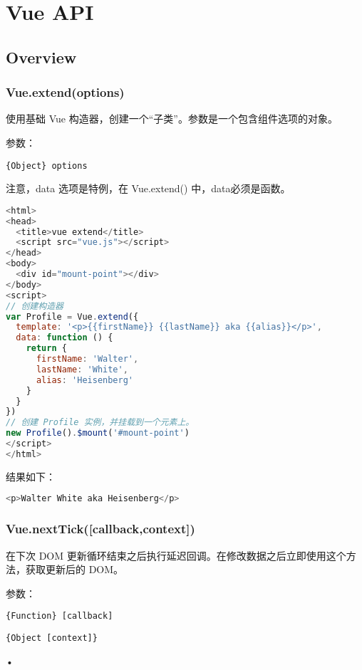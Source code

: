 \part{Vue API}


\chapter{Overview}


\section{Vue.extend(options)}

使用基础 Vue 构造器，创建一个“子类”。参数是一个包含组件选项的对象。

参数：


\begin{compactitem}
\item \texttt{\{Object\} options}
\end{compactitem}


注意，data 选项是特例，在 Vue.extend() 中，data必须是函数。

\begin{lstlisting}[language=JavaScript]
<html>
<head>
  <title>vue extend</title>
  <script src="vue.js"></script>
</head>
<body>
  <div id="mount-point"></div>
</body>
<script>
// 创建构造器
var Profile = Vue.extend({
  template: '<p>{{firstName}} {{lastName}} aka {{alias}}</p>',
  data: function () {
    return {
      firstName: 'Walter',
      lastName: 'White',
      alias: 'Heisenberg'
    }
  }
})
// 创建 Profile 实例，并挂载到一个元素上。
new Profile().$mount('#mount-point')
</script>
</html>
\end{lstlisting}

结果如下：



\begin{lstlisting}[language=JavaScript]
<p>Walter White aka Heisenberg</p>
\end{lstlisting}

\section{Vue.nextTick([callback,context])}

在下次 DOM 更新循环结束之后执行延迟回调。在修改数据之后立即使用这个方法，获取更新后的 DOM。

参数：

\begin{compactitem}
\item \texttt{\{Function\} [callback]}
\item \texttt{\{Object [context]\}}
\end{compactitem}•

